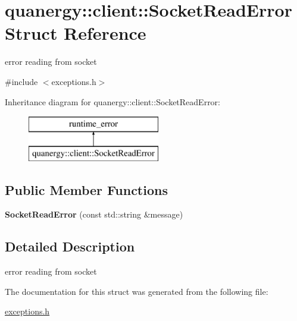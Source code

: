 \hypertarget{structquanergy_1_1client_1_1SocketReadError}{\section{quanergy\-:\-:client\-:\-:Socket\-Read\-Error Struct Reference}
\label{structquanergy_1_1client_1_1SocketReadError}
}


error reading from socket  




{\ttfamily \#include $<$exceptions.\-h$>$}

Inheritance diagram for quanergy\-:\-:client\-:\-:Socket\-Read\-Error\-:\begin{figure}[H]
\begin{center}
\leavevmode
\includegraphics[height=2.000000cm]{structquanergy_1_1client_1_1SocketReadError}
\end{center}
\end{figure}
\subsection*{Public Member Functions}
\begin{DoxyCompactItemize}
\item 
\hypertarget{structquanergy_1_1client_1_1SocketReadError_a756263e78118dbdbce69d19377c179f8}{{\bfseries Socket\-Read\-Error} (const std\-::string \&message)}\label{structquanergy_1_1client_1_1SocketReadError_a756263e78118dbdbce69d19377c179f8}

\end{DoxyCompactItemize}


\subsection{Detailed Description}
error reading from socket 

The documentation for this struct was generated from the following file\-:\begin{DoxyCompactItemize}
\item 
\hyperlink{exceptions_8h}{exceptions.\-h}\end{DoxyCompactItemize}
